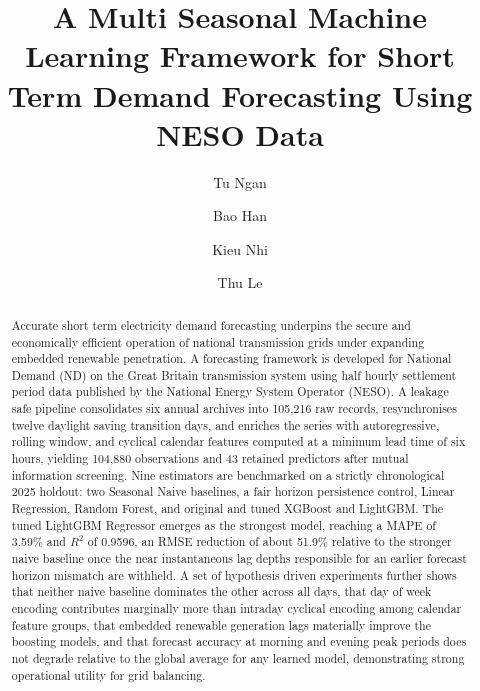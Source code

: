 \documentclass[runningheads]{llncs}
\begin{document}
%
\title{A Multi Seasonal Machine Learning Framework for Short Term Demand Forecasting Using NESO Data}
%
%
\author{Tu Ngan \and
Bao Han \and
Kieu Nhi \and
Thu Le }
%
\maketitle
%
\begin{abstract}
Accurate short term electricity demand forecasting underpins the secure and economically efficient operation of national transmission grids under expanding embedded renewable penetration. A forecasting framework is developed for National Demand (ND) on the Great Britain transmission system using half hourly settlement period data published by the National Energy System Operator (NESO). A leakage safe pipeline consolidates six annual archives into 105{,}216 raw records, resynchronises twelve daylight saving transition days, and enriches the series with autoregressive, rolling window, and cyclical calendar features computed at a minimum lead time of six hours, yielding 104{,}880 observations and 43 retained predictors after mutual information screening. Nine estimators are benchmarked on a strictly chronological 2025 holdout: two Seasonal Naive baselines, a fair horizon persistence control, Linear Regression, Random Forest, and original and tuned XGBoost and LightGBM. The tuned LightGBM Regressor emerges as the strongest model, reaching a MAPE of 3.59\% and $R^2$ of 0.9596, an RMSE reduction of about 51.9\% relative to the stronger naive baseline once the near instantaneous lag depths responsible for an earlier forecast horizon mismatch are withheld. A set of hypothesis driven experiments further shows that neither naive baseline dominates the other across all days, that day of week encoding contributes marginally more than intraday cyclical encoding among calendar feature groups, that embedded renewable generation lags materially improve the boosting models, and that forecast accuracy at morning and evening peak periods does not degrade relative to the global average for any learned model, demonstrating strong operational utility for grid balancing.
\end{abstract}
\end{document}
